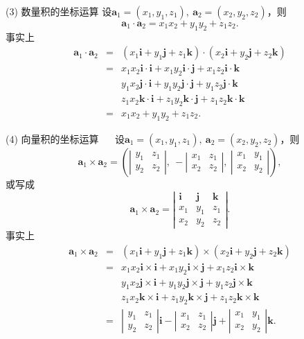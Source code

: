 \documentclass[compress,mathserif,cjk]{beamer}
\theoremstyle{remark}
\numberwithin{equation}{section}
\begin{document}
\begin{CJK}{UTF8}{gbsn}
\begin{frame}
\end{frame}

\begin{frame}
 (3) 数量积的坐标运算
 \vskip 5pt
 设$\bm a_1=(x_1,y_1,z_1),~\bm a_2=(x_2,y_2,z_2)$，则
 $$\bm a_1\cdot\bm a_2=x_1x_2+y_1y_2+z_1z_2.$$
 \pause 事实上
 \begin{eqnarray*}
 \bm a_1\cdot\bm a_2&=&(x_1\bm i+y_1\bm j+z_1\bm k)\cdot(x_2\bm i+y_2\bm j+z_2\bm k) \\
 &=&x_1x_2\bm i\cdot\bm i+x_1y_2\bm i\cdot\bm j+x_1z_2\bm i\cdot\bm k \\
 && y_1x_2\bm j\cdot\bm i+y_1y_2\bm j\cdot\bm j+y_1z_2\bm j\cdot\bm k \\
 && z_1x_2\bm k\cdot\bm i+z_1y_2\bm k\cdot\bm j+z_1z_2\bm k\cdot\bm k\\
 &=& x_1x_2+y_1y_2+z_1z_2.
 \end{eqnarray*}

\end{frame}


\begin{frame}
 (4) 向量积的坐标运算
　\vskip 5pt
 设$\bm a_1=(x_1,y_1,z_1),~\bm a_2=(x_2,y_2,z_2)$，则
 $$\bm a_1\times\bm a_2=\left(\left|\begin{matrix}y_1&z_1\\y_2&z_2\end{matrix}\right|,~-\left|\begin{matrix}x_1&z_1\\x_2&z_2\end{matrix}\right|,~\left|\begin{matrix}x_1&y_1\\x_2&y_2\end{matrix}\right|\right),$$
 或写成
  $$\bm a_1\times\bm a_2=\left|\begin{matrix}\bm i&\bm j&\bm k\\x_1&y_1&z_1\\x_2&y_2&z_2\end{matrix}\right|.$$
 \pause 事实上
 \begin{eqnarray*}
 \bm a_1\times\bm a_2&=&(x_1\bm i+y_1\bm j+z_1\bm k)\times(x_2\bm i+y_2\bm j+z_2\bm k) \\
 &=&x_1x_2\bm i\times\bm i+x_1y_2\bm i\times\bm j+x_1z_2\bm i\times\bm k \\
 && y_1x_2\bm j\times\bm i+y_1y_2\bm j\times\bm j+y_1z_2\bm j\times\bm k \\
 && z_1x_2\bm k\times\bm i+z_1y_2\bm k\times\bm j+z_1z_2\bm k\times\bm k \\
 &=& \left|\begin{matrix}y_1&z_1\\y_2&z_2\end{matrix}\right|\bm i-\left|\begin{matrix}x_1&z_1\\x_2&z_2\end{matrix}\right|\bm j+\left|\begin{matrix}x_1&y_1\\x_2&y_2\end{matrix}\right|\bm k.
 \end{eqnarray*}
\end{frame}


\end{CJK}
\end{document}
